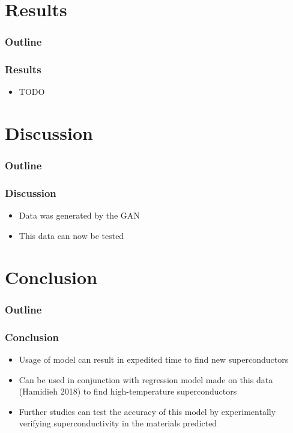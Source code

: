 \documentclass[12pt]{beamer}
\begin{document}
\section{Results}
\begin{frame}
\frametitle{Outline}
\tableofcontents[currentsection]
\end{frame}

\begin{frame}

\frametitle{Results}
\begin{itemize}
    \item TODO
\end{itemize}

\end{frame}

\section{Discussion}
\begin{frame}
\frametitle{Outline}
\tableofcontents[currentsection]
\end{frame}

\begin{frame}
\frametitle{Discussion}
\pause
\begin{itemize}
  \item Data was generated by the GAN
  \pause
  \item This data can now be tested
\end{itemize}
\pause

\end{frame}

\section{Conclusion}
\begin{frame}
\frametitle{Outline}
\tableofcontents[currentsection]
\end{frame}

\begin{frame}
\frametitle{Conclusion}
\pause
\begin{itemize}
  \item Usage of model can result in expedited time to find new superconductors
  \pause
  \item Can be used in conjunction with regression model made on this data (Hamidieh 2018) to find high-temperature superconductors
  \pause
  \item Further studies can test the accuracy of this model by experimentally verifying superconductivity in the materials predicted
\end{itemize}



\end{frame}
\end{document}
